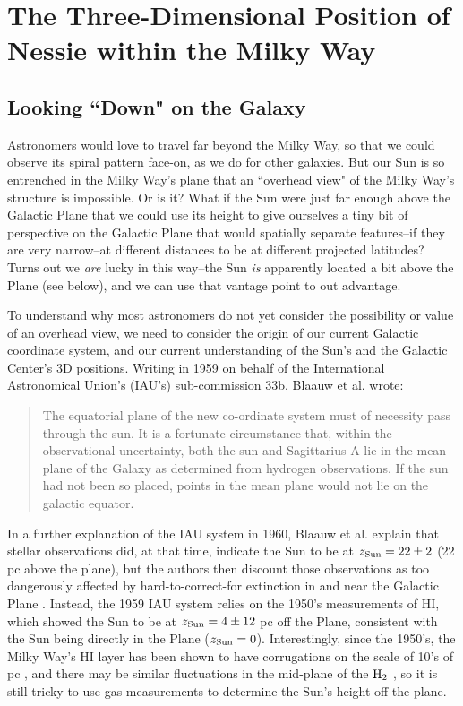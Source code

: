 \section{The Three-Dimensional Position of Nessie within the Milky Way}
\label{3D}

\subsection{Looking ``Down" on the Galaxy}
\label{lookingdown}
Astronomers would love to travel far beyond the Milky Way, so that we could observe its spiral pattern face-on, as we do for other galaxies.  But our Sun is so entrenched in the Milky Way's plane that an ``overhead view" of the Milky Way's structure is impossible.  Or is it?  What if the Sun were just far enough above the Galactic Plane that we could use its height to give ourselves a tiny bit of perspective on the Galactic Plane that would spatially separate features--if they are very narrow--at different distances to be at different projected latitudes?  Turns out we {\it are} lucky in this way--the Sun {\it is} apparently located a bit above the Plane (see below), and we can use that vantage point to out advantage.  

To understand why most astronomers do not yet consider the possibility or value of an overhead view, we need to consider the origin of our current Galactic coordinate system, and our current understanding of the Sun's and the Galactic Center's 3D positions.  Writing in 1959 on behalf of the International Astronomical Union's (IAU's) sub-commission 33b, Blaauw et al.
wrote: 
\begin{quotation}
The equatorial plane of the new co-ordinate system must of
necessity pass through the sun. It is a fortunate circumstance that,
within the observational uncertainty, both the sun and Sagittarius A lie
in the mean plane of the Galaxy as determined from hydrogen
observations. If the sun had not been so placed, points in the mean
plane would not lie on the galactic equator.
\end{quotation}
In a further explanation of the IAU system in 1960, Blaauw et al. explain that stellar observations did, at that time, indicate  the Sun to be at $z_{\rm Sun}=22 \pm 2$ (22 pc above the plane), but the authors then discount those observations as too dangerously affected by hard-to-correct-for extinction in and near the Galactic Plane \citep{1960MNRAS.121..123B}.   Instead, the 1959 IAU system relies on the 1950's measurements of HI, which showed the Sun to be at $z_{\rm Sun}=4\pm 12$ pc off the Plane, consistent with the Sun being directly in the Plane ($z_{\rm Sun}=0$).  Interestingly, since the 1950's, the Milky Way's HI layer has been shown to have corrugations on the scale of 10's of pc \citep{Malhotra1995}, and there may be similar fluctuations in the mid-plane of the ${\rm H_2}$ \citep{Malhotra1994}, so it is still tricky to use gas measurements to determine the Sun's height off the plane.

